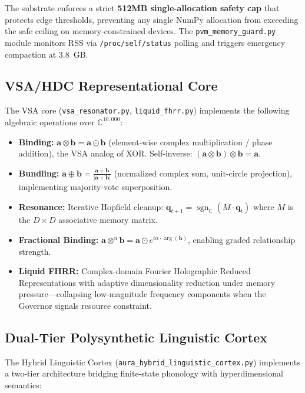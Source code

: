 \documentclass[11pt]{article}
\begin{document}
The substrate enforces a strict \textbf{512MB single-allocation safety cap} that protects edge thresholds, preventing any single NumPy allocation from exceeding the safe ceiling on memory-constrained devices. The \texttt{pvm\_memory\_guard.py} module monitors RSS via \texttt{/proc/self/status} polling and triggers emergency compaction at 3.8~GB.

\subsection{VSA/HDC Representational Core}

The VSA core (\texttt{vsa\_resonator.py}, \texttt{liquid\_fhrr.py}) implements the following algebraic operations over $\mathbb{C}^{10{,}000}$:

\begin{itemize}
    \item \textbf{Binding:} $\mathbf{a} \otimes \mathbf{b} = \mathbf{a} \odot \mathbf{b}$ (element-wise complex multiplication / phase addition), the VSA analog of XOR. Self-inverse: $(\mathbf{a} \otimes \mathbf{b}) \otimes \mathbf{b} = \mathbf{a}$.
    \item \textbf{Bundling:} $\mathbf{a} \oplus \mathbf{b} = \frac{\mathbf{a} + \mathbf{b}}{|\mathbf{a} + \mathbf{b}|}$ (normalized complex sum, unit-circle projection), implementing majority-vote superposition.
    \item \textbf{Resonance:} Iterative Hopfield cleanup: $\mathbf{q}_{t+1} = \operatorname{sgn}_{\mathbb{C}}(M \cdot \mathbf{q}_t)$ where $M$ is the $D \times D$ associative memory matrix.
    \item \textbf{Fractional Binding:} $\mathbf{a} \otimes^{\alpha} \mathbf{b} = \mathbf{a} \odot e^{i\alpha \cdot \arg(\mathbf{b})}$, enabling graded relationship strength.
    \item \textbf{Liquid FHRR:} Complex-domain Fourier Holographic Reduced Representations with adaptive dimensionality reduction under memory pressure—collapsing low-magnitude frequency components when the Governor signals resource constraint.
\end{itemize}

\subsection{Dual-Tier Polysynthetic Linguistic Cortex}

The Hybrid Linguistic Cortex (\texttt{aura\_hybrid\_linguistic\_cortex.py}) implements a two-tier architecture bridging finite-state phonology with hyperdimensional semantics:
\end{document}
